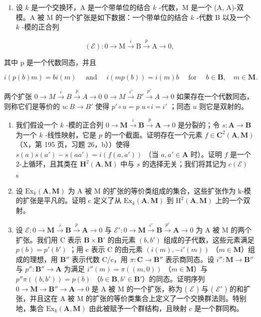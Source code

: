 
\begin{enumerate}
\def\labelenumi{\arabic{enumi})}
\tightlist
\item
  设 \(k\) 是一个交换环，A 是一个带单位的结合 \(k\) -代数，M 是一个 (A, A)-双模。A 被 M 的一个扩张是如下数据：一个带单位的结合 \(k\) -代数 B 以及一个 \(k\) -模的正合列
\end{enumerate}

\[
(\mathcal {E}): 0 \rightarrow \mathrm{M} \stackrel {{i}} {{\rightarrow}} \mathrm{B} \stackrel {{p}} {{\rightarrow}} \mathrm{A} \rightarrow 0,
\]

其中 p 是一个代数同态，并且

\[
i (p (b) m) = b i (m) \quad \text { and } \quad i (m p (b)) = i (m) b \quad \text { for } \quad b \in \mathbf {B}, \quad m \in \mathbf {M}.
\]

两个扩张 \(0 \to M \xrightarrow{i} B \xrightarrow{p} A \to 0\) \(0 \to M \xrightarrow{i'} B' \xrightarrow{p'} A \to 0\) 如果存在一个代数同态，则称它们是等价的 \(u: B \to B'\) 使得 \(p' \circ u = p\) \(u \circ i = i'\) ；同态 \(u\) 则它是双射的。

\begin{enumerate}
\def\labelenumi{\alph{enumi})}
\item
  我们假设一个 \(k\) -模的正合列 \(0 \to \mathbf{M} \xrightarrow{i} \mathbf{B} \xrightarrow{p} \mathbf{A} \to 0\) 是分裂的；令 \(s: \mathbf{A} \to \mathbf{B}\) 为一个 \(k\) -线性映射，它是 \(p\) 的一个截面。证明存在一个元素 \(f \in \mathbf{C}^2(\mathbf{A}, \mathbf{M})\) （X，第 195 页，习题 26，b））使得 \(s(a) s(a') - s(aa') = i(f(a, a'))\) （当 \(a, a' \in \mathbf{A}\) 时）。证明 \(f\) 是一个 2-上循环，且其类在 \(\mathbf{H}^2(\mathbf{A}, \mathbf{M})\) 中与 \(s\) 的选择无关；我们将其记为 \(c(\mathcal{E})\) 。
\item
  设 \(\mathrm{Ex}_{k}(\mathbf{A},\mathbf{M})\) 为 A 被 M 的扩张的等价类组成的集合，这些扩张作为 k-模的扩张是平凡的。证明 c 定义了从 \(\mathrm{Ex}_{k}(\mathbf{A},\mathbf{M})\) 到 \(\mathrm{H}^{2}(\mathbf{A},\mathbf{M})\) 上的一个双射。
\item
  设 \(\mathcal{E}:0\to\mathbf{M}\stackrel{i}{\to}\mathbf{B}\stackrel{p}{\to}\mathbf{A}\to0\) 与 \(\mathcal{E}':0\to\mathbf{M}\stackrel{i'}{\to}\mathbf{B}\stackrel{p'}{\to}\mathbf{A}\to0\) 为 A 被 M 的两个扩张。我们用 C 表示 \(\mathbf{B}\times\mathbf{B}'\) 的由元素 \((b,b')\) 组成的子代数，这些元素满足 \(p(b)=p'(b')\) ；用 c 表示 C 的由元素 \((i(m),-i'(m))\) （\(m\in\mathbf{M}\)）组成的理想，用 \(\mathbf{B}''\) 表示代数 C/c，用 \(\pi:\mathbf{C}\to\mathbf{B}''\) 表示商同态。设 \(i'':\mathbf{M}\to\mathbf{B}''\) 与 \(p'':\mathbf{B}''\to\mathbf{A}\) 为满足 \(i''(m)=\pi((m,0))\) （\(m\in\mathbf{M}\)）与 \(p''\pi((b,b'))=p(b)\) （\(b\in\mathbf{B},b'\in\mathbf{B}'\)）的同态。证明序列 \(0\to\mathbf{M}\to\mathbf{B}''\to\mathbf{A}\to0\) 是 A 被 M 的一个扩张，称为 ( \(\mathcal{E}\) ) 与 ( \(\mathcal{E}'\) ) 的和扩张，并且这在 A 被 M 的扩张的等价类集合上定义了一个交换群法则。特别地，集合 \(\mathrm{Ex}_{k}(\mathbf{A},\mathbf{M})\) 由此被赋予一个群结构，且映射 \(c\) 是一个群同构。
\end{enumerate}

